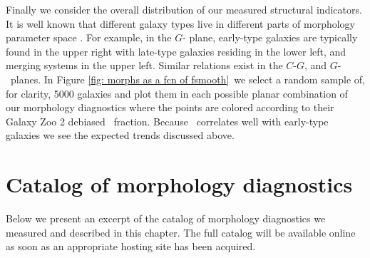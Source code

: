 
Finally we consider the overall distribution of our measured structural indicators. It is well known that different galaxy types live in different parts of morphology parameter space \citep{Abraham1996,Abraham2003,Conselice2000,Lotz2004,Lotz2008}. For example, in the $G$- plane, early-type galaxies are typically found in the upper right with late-type galaxies residing in the lower left, and merging systems in the upper left. Similar relations exist in the $C$-$G$, and $G$-~planes. In Figure \ref{fig: morphs as a fcn of fsmooth}~we select a random sample of, for clarity, 5000 galaxies and plot them in each possible planar combination of our morphology diagnostics where the points are colored according to their Galaxy Zoo 2 debiased \fsmooth~fraction. Because \fsmooth~correlates well with early-type galaxies we see the expected trends discussed above. 



\section{Catalog of morphology diagnostics}
Below we present an excerpt of the catalog of morphology diagnostics we measured and described in this chapter. The full catalog will be available online as soon as an appropriate hosting site has been acquired. 


\label{tab: morphologies}


